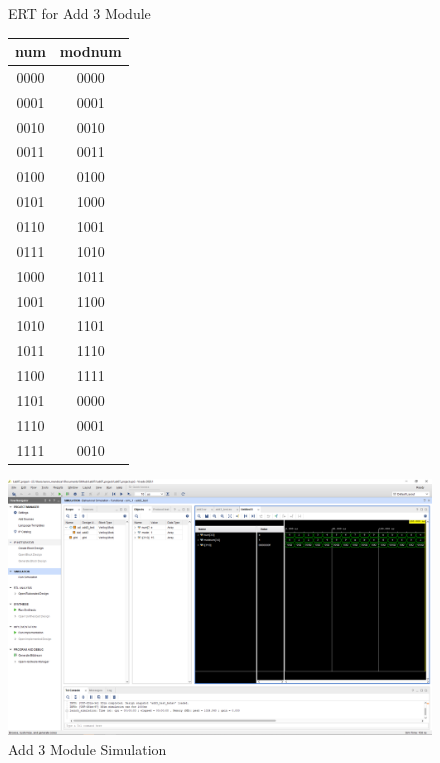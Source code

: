 \documentclass[11pt]{article}
\begin{document}
\begin{figure}[ht]\centering
		\caption{ERT for Add 3 Module}
		\label{tbl:example_table}
		\begin{tabular}{c|c}
			\toprule
			num & modnum \\
			\midrule
			0000 & 0000 \\
			0001 & 0001 \\
			0010 & 0010 \\
			0011 & 0011 \\
			0100 & 0100 \\
			0101 & 1000 \\
			0110 & 1001 \\
			0111 & 1010 \\
			1000 & 1011 \\
			1001 & 1100 \\
			1010 & 1101 \\
			1011 & 1110 \\
			1100 & 1111 \\
			1101 & 0000 \\
			1110 & 0001 \\
			1111 & 0010 \\
			\bottomrule
		\end{tabular} 

	\includegraphics[width=1\textwidth,trim=19cm 15cm 0.5cm 4.5cm,clip]{add3_test_screenshot}
	\caption{Add 3 Module Simulation}
	\label{fig:sim_with_table}
\end{figure}
\end{document}
